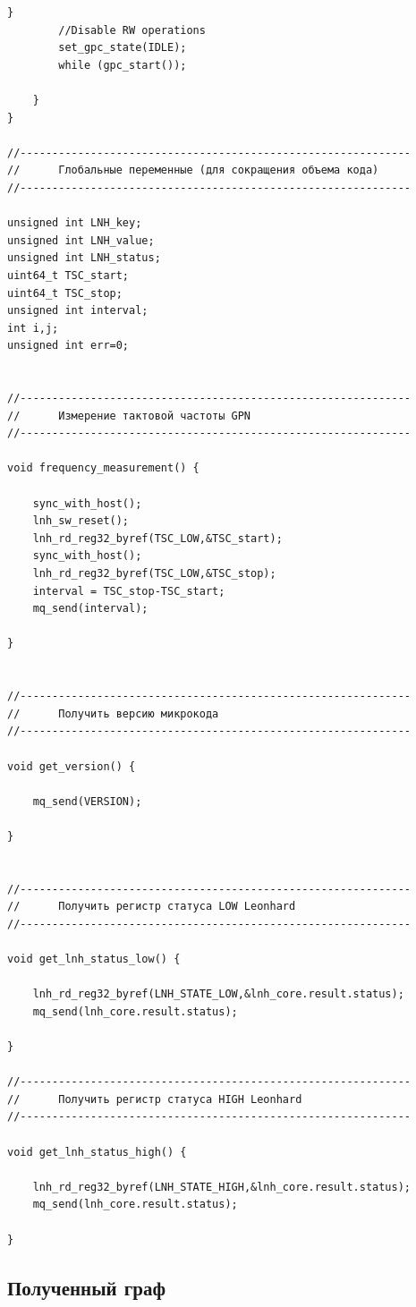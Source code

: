 \begin{lstlisting}[label=lst:swkernel,caption=Измененный код sw\_kernel под индивидульное задание]
		}
		//Disable RW operations
		set_gpc_state(IDLE);
		while (gpc_start());
		
	}
}

//-------------------------------------------------------------
//      Глобальные переменные (для сокращения объема кода)
//-------------------------------------------------------------

unsigned int LNH_key;
unsigned int LNH_value;
unsigned int LNH_status;
uint64_t TSC_start;
uint64_t TSC_stop;
unsigned int interval;
int i,j;
unsigned int err=0;


//-------------------------------------------------------------
//      Измерение тактовой частоты GPN
//-------------------------------------------------------------

void frequency_measurement() {
	
	sync_with_host();
	lnh_sw_reset();
	lnh_rd_reg32_byref(TSC_LOW,&TSC_start);
	sync_with_host();
	lnh_rd_reg32_byref(TSC_LOW,&TSC_stop);
	interval = TSC_stop-TSC_start;
	mq_send(interval);
	
}


//-------------------------------------------------------------
//      Получить версию микрокода 
//-------------------------------------------------------------

void get_version() {
	
	mq_send(VERSION);
	
}


//-------------------------------------------------------------
//      Получить регистр статуса LOW Leonhard 
//-------------------------------------------------------------

void get_lnh_status_low() {
	
	lnh_rd_reg32_byref(LNH_STATE_LOW,&lnh_core.result.status);
	mq_send(lnh_core.result.status);
	
}

//-------------------------------------------------------------
//      Получить регистр статуса HIGH Leonhard 
//-------------------------------------------------------------

void get_lnh_status_high() {
	
	lnh_rd_reg32_byref(LNH_STATE_HIGH,&lnh_core.result.status);
	mq_send(lnh_core.result.status);
	
}
\end{lstlisting}

\subsection{Полученный граф}

